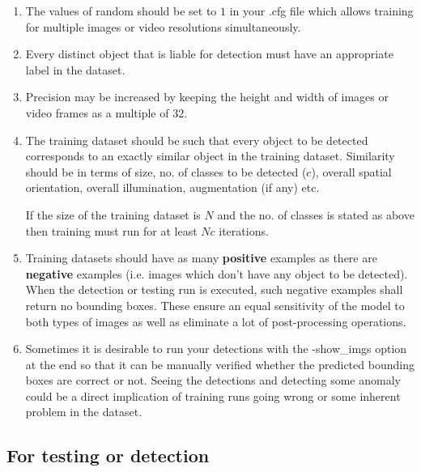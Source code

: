 \begin{enumerate}
  \item The values of {\selectfont random} should be set to $1$ in your  {\selectfont .cfg} file which allows training for multiple images or video resolutions simultaneously.
  \item Every distinct object that is liable for detection must have an appropriate label in the dataset.
  \item Precision may be increased by keeping the height and width of images or video frames as a multiple of $32$.
  \item The training dataset should be such that every object to be detected corresponds to an exactly similar object in the training dataset. Similarity should be in terms of size, no. of classes to be detected ($c$), overall spatial orientation, overall illumination, augmentation (if any) etc. \par

  If the size of the training dataset is $N$ and the no. of classes is stated as above then training must run for at least $Nc$ iterations.
  \item Training datasets should have as many \textbf{positive} examples as there are \textbf{negative} examples (i.e. images which don’t have any object to be detected). When the detection or testing run is executed, such negative examples shall return no bounding boxes. These ensure an equal sensitivity of the model to both types of images as well as eliminate a lot of post-processing operations.
  \item Sometimes it is desirable to run your detections with the {\selectfont -show\_imgs} option at the end so that it can be manually verified whether the predicted bounding boxes are correct or not. Seeing the detections and detecting some anomaly could be a direct implication of training runs going wrong or some inherent problem in the dataset.
\end{enumerate}


\subsection{For testing or detection}

